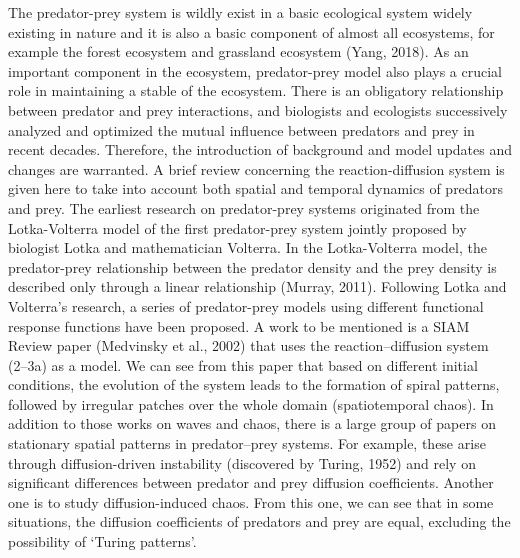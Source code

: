 \documentclass[12pt]{article}
\begin{document}
\noindent The predator-prey system is wildly exist in  a basic ecological system widely existing in nature and it is also a basic component of almost all ecosystems, for example the forest ecosystem and grassland ecosystem (Yang, 2018). As an important component in the ecosystem, predator-prey model also plays a crucial role in maintaining a stable of the ecosystem. There is an obligatory relationship between predator and prey interactions, and biologists and ecologists successively analyzed and optimized the mutual influence between predators and prey in recent decades. Therefore, the introduction of background and model updates and changes are warranted. A brief review concerning the reaction-diffusion system is given here to take into account both spatial and temporal dynamics of predators and prey. The earliest research on predator-prey systems originated from the Lotka-Volterra model of the first predator-prey system jointly proposed by biologist Lotka and mathematician Volterra. In the Lotka-Volterra model, the predator-prey relationship between the predator density and the prey density is described only through a linear relationship (Murray, 2011). Following Lotka and Volterra's research, a series of predator-prey models using different functional response functions have been proposed. A work to be mentioned is a SIAM Review paper (Medvinsky et al., 2002) that uses the reaction–diffusion system (2–3a) as a model. We can see from this paper that based on different initial conditions, the evolution of the system leads to the formation of spiral patterns, followed by irregular patches over the whole domain (spatiotemporal chaos). In addition to those works on waves and chaos, there is a large group of papers on stationary spatial patterns in predator–prey systems. For example, these arise through diffusion-driven instability (discovered by Turing, 1952) and rely on significant differences between predator and prey diffusion coefficients. Another one is to study diffusion-induced chaos. From this one, we can see that in some situations, the diffusion coefficients of predators and prey are equal, excluding the possibility of ‘Turing patterns’.
\vspace{24pt}
\end{document}
